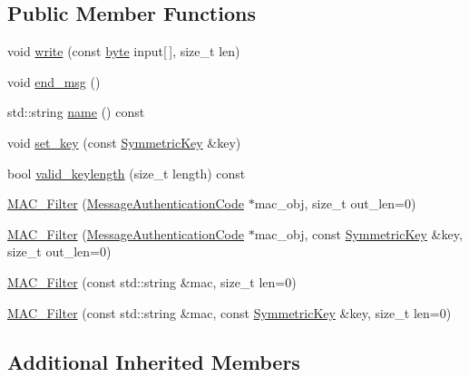 \subsection*{Public Member Functions}
\begin{DoxyCompactItemize}
\item 
void \hyperlink{classBotan_1_1MAC__Filter_aa5d6b9c589b93a96931af4e93a531a96}{write} (const \hyperlink{namespaceBotan_a7d793989d801281df48c6b19616b8b84}{byte} input\mbox{[}$\,$\mbox{]}, size\-\_\-t len)
\item 
void \hyperlink{classBotan_1_1MAC__Filter_a5aa93f5eac49e5b0d706b3a6c52bea27}{end\-\_\-msg} ()
\item 
std\-::string \hyperlink{classBotan_1_1MAC__Filter_aed2f438c8a6eccaf5faa021c58121795}{name} () const 
\item 
void \hyperlink{classBotan_1_1MAC__Filter_aa4a3df14bccb37faf4e91a9c8aa3c7c0}{set\-\_\-key} (const \hyperlink{namespaceBotan_a00c78597211d5c63b63e2a57ddb96d38}{Symmetric\-Key} \&key)
\item 
bool \hyperlink{classBotan_1_1MAC__Filter_ab500e8c6e8d020634fae9f993ee58d7a}{valid\-\_\-keylength} (size\-\_\-t length) const 
\item 
\hyperlink{classBotan_1_1MAC__Filter_a704d18ab67042b528507804b1a66c320}{M\-A\-C\-\_\-\-Filter} (\hyperlink{classBotan_1_1MessageAuthenticationCode}{Message\-Authentication\-Code} $\ast$mac\-\_\-obj, size\-\_\-t out\-\_\-len=0)
\item 
\hyperlink{classBotan_1_1MAC__Filter_a60294d8b7d8f8c2b2695673a3d03bb8d}{M\-A\-C\-\_\-\-Filter} (\hyperlink{classBotan_1_1MessageAuthenticationCode}{Message\-Authentication\-Code} $\ast$mac\-\_\-obj, const \hyperlink{namespaceBotan_a00c78597211d5c63b63e2a57ddb96d38}{Symmetric\-Key} \&key, size\-\_\-t out\-\_\-len=0)
\item 
\hyperlink{classBotan_1_1MAC__Filter_a2594ab2c358bd6af6950f0a8524f39c7}{M\-A\-C\-\_\-\-Filter} (const std\-::string \&mac, size\-\_\-t len=0)
\item 
\hyperlink{classBotan_1_1MAC__Filter_aa84f445ad290dac760f0c06b44ca5e21}{M\-A\-C\-\_\-\-Filter} (const std\-::string \&mac, const \hyperlink{namespaceBotan_a00c78597211d5c63b63e2a57ddb96d38}{Symmetric\-Key} \&key, size\-\_\-t len=0)
\end{DoxyCompactItemize}
\subsection*{Additional Inherited Members}


